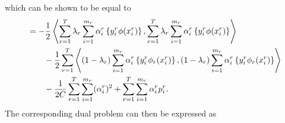 which can be shown to be equal to
\begin{equation}\nonumber
    \begin{aligned}
        &= - \frac{1}{2} \bm{\left\langle}  \sum_{r= 1}^T  \lambda_r \sum_{i=1}^{m_r} {\alpha_i^r} \left\lbrace y_i^r \phi({x}_i^r) \right\rbrace,  \sum_{r= 1}^T \lambda_r \sum_{i=1}^{m_r} {\alpha_i^r} \left\lbrace y_i^r \phi({x}_i^r) \right\rbrace \bm{\right\rangle} \\
        &\qquad - \frac{1}{2} \sum_{r= 1}^T { \bm{\left\langle} (1-\lambda_r) \sum_{i=1}^{m_r} {\alpha_i^r} \left\lbrace y_i^r \phi_r({x}_i^r) \right\rbrace, (1-\lambda_r) \sum_{i=1}^{m_r} {\alpha_i^r} \left\lbrace y_i^r \phi_r({x}_i^r) \right\rbrace \bm{\right\rangle}} \\
        &\qquad - \frac{1}{2C} \sum_{r=1}^T \sum_{i=1}^{m_r} (\alpha_i^r)^2  +  \sum_{r= 1}^T \sum_{i=1}^{m_r} \alpha_i^r  p_{i}^r .
    \end{aligned}
\end{equation}
The corresponding dual problem can then be expressed as
